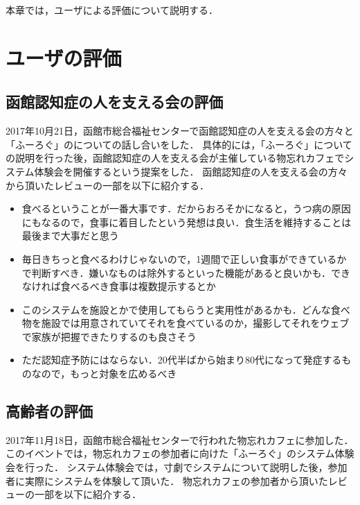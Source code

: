 \documentclass[../report]{subfiles}
\begin{document}
本章では，ユーザによる評価について説明する．

\section{ユーザの評価}
\subsection{函館認知症の人を支える会の評価} \label{sec:7_hyouka_monowasurecafe}
2017年10月21日，函館市総合福祉センターで函館認知症の人を支える会の方々と「ふーろぐ」のについての話し合いをした．
具体的には，「ふーろぐ」についての説明を行った後，函館認知症の人を支える会が主催している物忘れカフェでシステム体験会を開催するという提案をした．
函館認知症の人を支える会の方々から頂いたレビューの一部を以下に紹介する．

\begin{itemize}
    \item 食べるということが一番大事です．だからおろそかになると，うつ病の原因にもなるので，食事に着目したという発想は良い．食生活を維持することは最後まで大事だと思う
    \item 毎日きちっと食べるわけじゃないので，1週間で正しい食事ができているかで判断すべき．嫌いなものは除外するといった機能があると良いかも．できなければ食べるべき食事は複数提示するとか
    \item このシステムを施設とかで使用してもらうと実用性があるかも．どんな食べ物を施設では用意されていてそれを食べているのか，撮影してそれをウェブで家族が把握できたりするのも良さそう
    \item ただ認知症予防にはならない．20代半ばから始まり80代になって発症するものなので，もっと対象を広めるべき
\end{itemize}

\subsection{高齢者の評価} \label{sec:7_hyouka_system}
2017年11月18日，函館市総合福祉センターで行われた物忘れカフェに参加した．
このイベントでは，物忘れカフェの参加者に向けた「ふーろぐ」のシステム体験会を行った．
システム体験会では，寸劇でシステムについて説明した後，参加者に実際にシステムを体験して頂いた．
物忘れカフェの参加者から頂いたレビューの一部を以下に紹介する．
\end{document}

